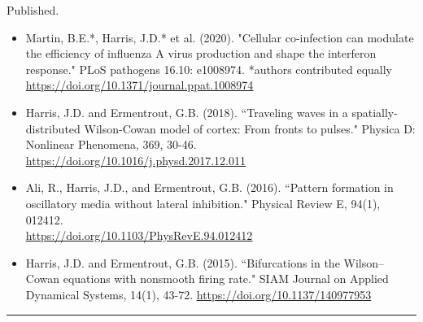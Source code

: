 \documentclass[a4paper,10pt]{article}
\newlength{\cvcolumngapwidth}
\newlength{\cvleftcolumnwidth}
\newlength{\cvrightcolumnwidth}
\newcommand{\cvsectionstyle}[1]{{\normalsize\cvsectionfont\textcolor{cvsectioncolor}{#1}}}
\newcommand{\cvtitlestyle}[1]{{\large\cvtitlefont\textcolor{cvtitlecolor}{#1}}}
\newcommand{\cvdurationstyle}[1]{{\small\cvdurationfont\textcolor{cvdurationcolor}{#1}}}
\newlength{\cvafteritemskipamount}
\newlength{\cvaftersectionskipamount}
\newlength{\cvbetweensectionandheadingextraskipamount}
\newlength{\cvaftertitleskipamount}
\newlength{\cvparskip}
\newcommand{\cvsection}[1]{
    \begin{minipage}[t]{\cvleftcolumnwidth}
        \raggedleft\cvsectionstyle{#1}
    \end{minipage}%
    \hspace{\cvcolumngapwidth}%
    \begin{minipage}[t]{\cvrightcolumnwidth}
        \textcolor{cvrulecolor}{\rule{\cvrightcolumnwidth}{0.3mm}}
    \end{minipage}

    \vspace{\cvaftersectionskipamount}
}
\newcommand{\cvitem}[2]{
    \begin{minipage}[t]{\cvleftcolumnwidth}
        \raggedleft #1
    \end{minipage}%
    \hspace{\cvcolumngapwidth}%
    \begin{minipage}[t]{\cvrightcolumnwidth}
        \setlength{\parskip}{\cvparskip} #2
    \end{minipage}

    \vspace{\cvafteritemskipamount}
}
\newcommand{\cvtitle}[1]{
    \cvtitlestyle{#1}

    \vspace{\cvaftertitleskipamount}
    \vspace{-\cvparskip}
}
\begin{document}
\cvitem{
    \cvdurationstyle{Published.}
}{
    \begin{itemize}[leftmargin=*]
        	\item Martin, B.E.*, Harris, J.D.* et al. (2020). "Cellular co-infection can modulate the efficiency of influenza A virus production and shape the interferon response." PLoS pathogens 16.10: e1008974. *authors contributed equally \href{https://doi.org/10.1371/journal.ppat.1008974}{\underline{https://doi.org/10.1371/journal.ppat.1008974}} \\
	        \item  Harris, J.D. and Ermentrout, G.B. (2018). ``Traveling waves in a spatially-distributed Wilson-Cowan model of cortex: From fronts to pulses." Physica D: Nonlinear Phenomena, 369, 30-46. \href{https://doi.org/10.1016/j.physd.2017.12.011}{\underline{https://doi.org/10.1016/j.physd.2017.12.011}} \\
    \end{itemize}
}    	
\cvitem{
    \cvdurationstyle{}
}{	
	\newpage
\begin{itemize}[leftmargin=*]	
        \item Ali, R., Harris, J.D., and Ermentrout, G.B. (2016). ``Pattern formation in oscillatory media without lateral inhibition." Physical Review E, 94(1), 012412. \\ \href{https://doi.org/10.1103/PhysRevE.94.012412}{\underline{https://doi.org/10.1103/PhysRevE.94.012412}} \\
        \item Harris, J.D. and Ermentrout, G.B. (2015). ``Bifurcations in the Wilson--Cowan equations with nonsmooth firing rate." SIAM Journal on Applied Dynamical Systems, 14(1), 43-72. \href{https://doi.org/10.1137/140977953}{\underline{https://doi.org/10.1137/140977953}}
    \end{itemize}

}


\cvsection{PRESENTATIONS}
\vspace{\cvbetweensectionandheadingextraskipamount}
\end{document}
